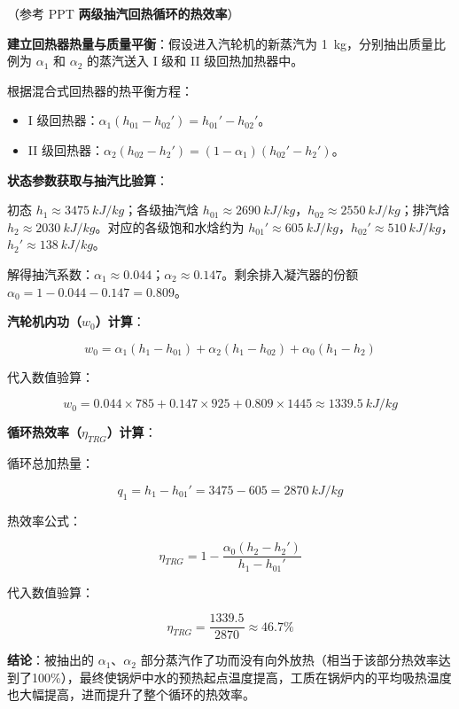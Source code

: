 \begin{solution}
（参考 PPT \textbf{两级抽汽回热循环的热效率}）

\textbf{建立回热器热量与质量平衡}：假设进入汽轮机的新蒸汽为 \qty{1}{kg}，分别抽出质量比例为 \(\alpha_1\) 和 \(\alpha_2\) 的蒸汽送入 I 级和 II 级回热加热器中。

根据混合式回热器的热平衡方程：
\begin{itemize}
  \item I 级回热器：\(\alpha_1(h_{01} - h_{02}') = h_{01}' - h_{02}'\)。
  \item II 级回热器：\(\alpha_2(h_{02} - h_2') = (1 - \alpha_1)(h_{02}' - h_2')\)。
\end{itemize}

\textbf{状态参数获取与抽汽比验算}：

初态 \(h_1 \approx \qty{3475}{kJ/kg}\)；各级抽汽焓 \(h_{01} \approx \qty{2690}{kJ/kg}\)，\(h_{02} \approx \qty{2550}{kJ/kg}\)；排汽焓 \(h_2 \approx \qty{2030}{kJ/kg}\)。对应的各级饱和水焓约为 \(h_{01}' \approx \qty{605}{kJ/kg}\)，\(h_{02}' \approx \qty{510}{kJ/kg}\)，\(h_2' \approx \qty{138}{kJ/kg}\)。

解得抽汽系数：\(\alpha_1 \approx 0.044\)；\(\alpha_2 \approx 0.147\)。剩余排入凝汽器的份额 \(\alpha_0 = 1 - 0.044 - 0.147 = 0.809\)。

\textbf{汽轮机内功（\(w_0\)）计算}：

\begin{equation*}
  w_0 = \alpha_1(h_1 - h_{01}) + \alpha_2(h_1 - h_{02}) + \alpha_0(h_1 - h_2)
\end{equation*}

代入数值验算：

\begin{equation*}
  w_0 = 0.044 \times 785 + 0.147 \times 925 + 0.809 \times 1445 \approx \qty{1339.5}{kJ/kg}
\end{equation*}

\textbf{循环热效率（\(\eta_{TRG}\)）计算}：

循环总加热量：

\begin{equation*}
  q_1 = h_1 - h_{01}' = 3475 - 605 = \qty{2870}{kJ/kg}
\end{equation*}

热效率公式：

\begin{equation*}
  \eta_{TRG} = 1 - \frac{\alpha_0(h_2 - h_2')}{h_1 - h_{01}'}
\end{equation*}

代入数值验算：

\begin{equation*}
  \eta_{TRG} = \frac{1339.5}{2870} \approx 46.7\%
\end{equation*}

\textbf{结论}：被抽出的 \(\alpha_1\)、\(\alpha_2\) 部分蒸汽作了功而没有向外放热（相当于该部分热效率达到了100\%），最终使锅炉中水的预热起点温度提高，工质在锅炉内的平均吸热温度也大幅提高，进而提升了整个循环的热效率。

\end{solution}

